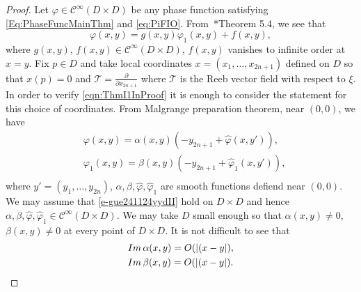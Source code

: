 \documentclass[12pt]{amsart}
\theoremstyle{definition}
\theoremstyle{named}
\numberwithin{equation}{subsection}
\newcommand{\pr}{\partial}
\newcommand{\abs}[1]{\left\vert#1\right\vert}
\def\cC{\mathscr{C}}
\begin{document}
\begin{proof}
Let $\varphi\in\cC^\infty(D\times D)$
 be any phase function satisfying 
\eqref{Eq:PhaseFuncMainThm} and \eqref{eq:PiFIO}. From~\cite{Hsiao_Marinescu_Szego_lower_energy_2017}*{Theorem 5.4}, we see that 
\begin{equation}\label{e-gue241124yydI}
\varphi(x,y)=g(x,y)\varphi_1(x,y)+f(x,y),
\end{equation}
 where $g(x,y)$, $f(x,y)\in\cC^\infty(D\times D)$, $f(x,y)$ vanishes to infinite order at $x=y$. Fix $p\in D$ and take local coordinates $x=(x_1,\ldots,x_{2n+1})$ defined on $D$ so that $x(p)=0$ and $\mathcal{T}=\frac{\pr}{\pr x_{2n+1}}$ where \(\mathcal{T}\) is the Reeb vector field with respect to \(\xi\). In order to verify \eqref{eqn:ThmI1InProof} it is enough to consider the statement for this choice of coordinates.
  From Malgrange preparation theorem, near $(0,0)$, we have 
 \begin{equation}\label{e-gue241124yydII}
\begin{split}
&\varphi(x,y)=\alpha(x,y)(-y_{2n+1}+\hat\varphi(x,y')),\\
&\varphi_1(x,y)=\beta(x,y)(-y_{2n+1}+\hat\varphi_1(x,y')),\\
\end{split}
 \end{equation}
where $y'=(y_1,\ldots,y_{2n})$, $\alpha, \beta, \hat\varphi, \hat\varphi_1$ are smooth functions defiend near $(0,0)$. We may assume that \eqref{e-gue241124yydII} hold on $D\times D$ and hence $\alpha, \beta, \hat\varphi, \hat\varphi_1\in\cC^\infty(D\times D)$. We may take $D$ small enough so that $\alpha(x,y)\neq0$, $\beta(x,y)\neq0$ at every point of $D\times D$. It is not difficult to see that 
\begin{equation}\label{e-gue241124yyda}
\begin{split}
&{\rm Im\,}\alpha(x,y)=O(\abs{(x-y}),\\
&{\rm Im\,}\beta(x,y)=O(\abs{(x-y}).
\end{split}
\end{equation} 


\end{proof}
\end{document}
